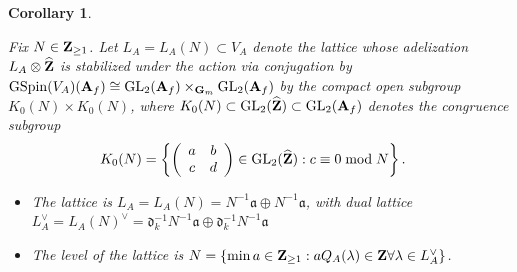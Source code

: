 \documentclass{amsart}
\newtheorem{corollary}[theorem]{Corollary}
\theoremstyle{definition}
\theoremstyle{definition}
\theoremstyle{definition}
\begin{document}
\begin{corollary}\label{lattices} 

Fix $N \in {\bf{Z}}_{\geq 1}$. Let  $L_A = L_A(N) \subset V_A$ denote the lattice whose adelization $L_A \otimes \widehat{\bf{Z}}$
is stabilized under the action via conjugation by $\operatorname{GSpin}(V_A)({\bf{A}}_f) \cong  \operatorname{GL}_2({\bf{A}}_f) \times_{{\bf{G}}_m} \operatorname{GL}_2({\bf{A}}_f)$
by the compact open subgroup $K_0(N) \times K_0(N)$, where 
$K_0(N) \subset \operatorname{GL}_2(\widehat{\bf{Z}}) \subset \operatorname{GL}_2({\bf{A}}_f)$ denotes the congruence subgroup 
\begin{align*} K_0(N) &= \left\lbrace \left(\begin{array}{cc} a & b \\ c & d \end{array} \right) \in \operatorname{GL}_2(\widehat{\bf{Z}}): c \equiv 0 \bmod N \right\rbrace.\end{align*} \begin{itemize}

\item[(i)] The lattice is $L_A = L_A(N) = N^{-1} \mathfrak{a} \oplus N^{-1} \mathfrak{a}$, with dual lattice 
$L_A^{\vee} = L_A(N)^{\vee} = \mathfrak{d}_k^{-1} N^{-1} \mathfrak{a} \oplus  \mathfrak{d}_k^{-1} N^{-1} \mathfrak{a}$

\item[(ii)] The level of the lattice is $N = \lbrace \min a \in {\bf{Z}}_{\geq 1}: aQ_A(\lambda) \in {\bf{Z}} \forall \lambda \in L_A^{\vee} \rbrace$.

\end{itemize}

\end{corollary}
\end{document}
